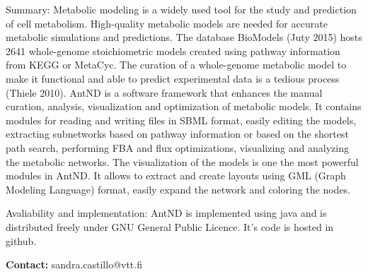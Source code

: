 Summary: Metabolic modeling is a widely used tool for the study and prediction of cell metabolism. High-quality metabolic models are needed for accurate metabolic simulations and predictions. The database BioModels (Juty 2015) hosts 2641 whole-genome stoichiometric models created using pathway information from KEGG or MetaCyc. The curation of a whole-genome metabolic model to make it functional and able to predict experimental data is a tedious process (Thiele 2010). AntND is a software framework that enhances the manual curation, analysis, visualization and optimization of metabolic models. It contains modules for reading and writing files in SBML format, easily editing the models, extracting subnetworks based on pathway information or based on the shortest path search, performing FBA and flux optimizations, visualizing and analyzing the metabolic networks. The visualization of the models is one the most powerful modules in AntND. It allows to extract and create layouts using GML (Graph Modeling Language) format, easily 
expand the network and coloring the nodes.

Avaliability and implementation: AntND is implemented using java and is distributed freely under GNU General Public Licence. It’s code is hosted in github.

\textbf{Contact:} sandra.castillo@vtt.fi

